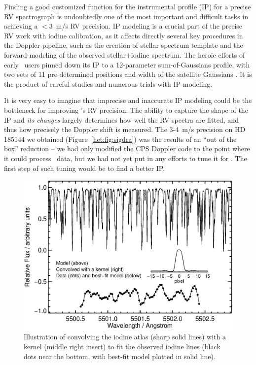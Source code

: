 
Finding a good customized function for the instrumental profile (IP)
for a precise RV spectrograph is undoubtedly one of the most important
and difficult tasks in achieving a $<3$~m/s RV precision. IP modeling
is a crucial part of the precise RV work with iodine calibration, as
it affects directly several key procedures in the Doppler pipeline,
such as the creation of stellar spectrum template and the
forward-modeling of the observed stellar$+$iodine spectrum. The heroic
efforts of early \keck\ users pinned down its IP to a 12-parameter
sum-of-Gaussians profile, with two sets of 11 pre-determined positions
and width of the satellite Gaussians \citep{1995PASP..107..966V}. It
is the product of careful studies and numerous trials with IP
modeling.

It is very easy to imagine that imprecise and inaccurate IP modeling
could be the bottleneck for improving \het's RV precision. The ability
to capture the shape of the IP and {\em its changes} largely determines
how well the RV spectra are fitted, and thus how precisely the Doppler
shift is measured. The 3-4~m/s precision on HD 185144 we obtained
(Figure~\ref{het:fig:sigdra}) was the results of an ``out of the box''
reduction -- we had only modified the CPS Doppler code to the point
where it could process \het\ data, but we had not yet put in any
efforts to tune it for \het. The first step of such tuning would be to
find a better IP.


\begin{figure}
\centering
\includegraphics[scale=0.45]{het/convolution_kernel.eps}
\caption{Illustration of convolving the iodine atlas (sharp solid
  lines) with a kernel (middle right insert) to fit the observed
  iodine lines (black dots near the bottom, with best-fit model
  plotted in solid line).
\label{het:fig:convkernel}}
\end{figure}



